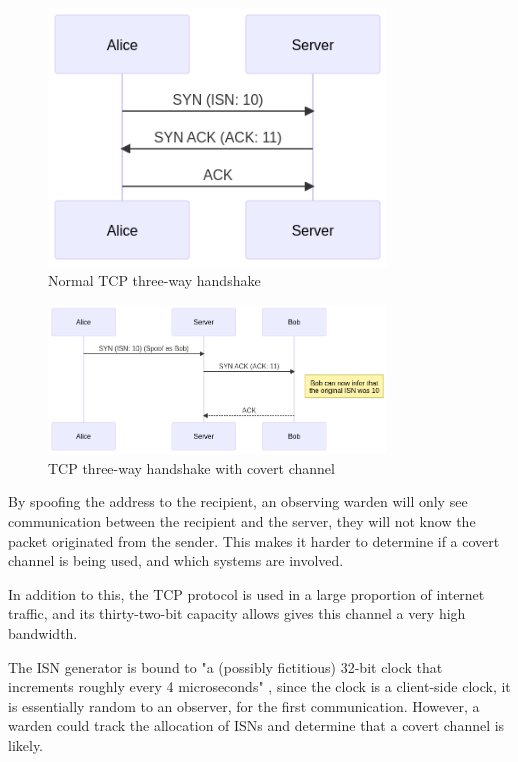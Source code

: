 \begin{figure}[!h]
    \centering
    \includegraphics[width=0.8\textwidth]{fig/TCPACKNormal.png}
    \caption{Normal TCP three-way handshake}
    \label{fig:TCPACKNormal}
\end{figure}

\begin{figure}[!h]
    \centering
    \includegraphics[width=0.8\textwidth]{fig/TCPACKCC.png}
    \caption{TCP three-way handshake with covert channel}
    \label{fig:TCPACKCC}
\end{figure}


By spoofing the address to the recipient, an observing warden will only see communication between the recipient and the server, they will not know the packet originated from the sender. This makes it harder to determine if a covert channel is being used, and which systems are involved.

In addition to this, the TCP protocol is used in a large proportion of internet traffic, and its thirty-two-bit capacity allows gives this channel a very high bandwidth.

The ISN generator is bound to "a (possibly fictitious) 32-bit clock that increments roughly every 4 microseconds" \cite{Trfc793}, since the clock is a client-side clock, it is essentially random to an observer, for the first communication. However, a warden could track the allocation of ISNs and determine that a covert channel is likely.

